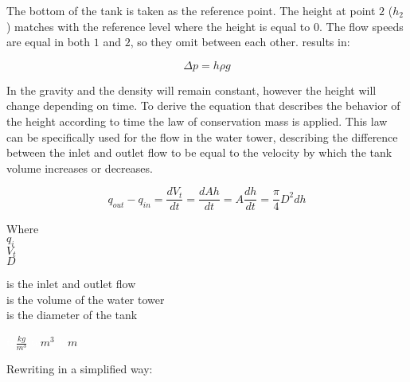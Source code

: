 The bottom of the tank is taken as the reference point. The height at point $2$ ($h_2$) matches with the reference level 
where the height is equal to 0. The flow speeds are equal in both $1$ 
and $2$, so they omit between each other.  results in: 

\begin{equation}
  \Delta p = h \rho g
  \label{Pressuredifference}
\end{equation}

In  the gravity and the density will remain constant, 
however the height will change depending on time. 
To derive the equation that describes the behavior of the height according to 
time the law of conservation mass is applied. This law can be specifically used for the flow in the water tower, describing the difference between the inlet and outlet flow 
to be equal to the velocity by which the tank volume increases or decreases. 

\begin{equation}
  q_{out} - q_{in} = \frac{dV_t}{dt} = \frac{dAh}{dt} = A \frac{dh}{dt} = \frac{\pi}{4} D^2 {dh}
  \label{FlowConservation}
\end{equation}

\begin{minipage}[t]{0.20\textwidth}
Where\\
\hspace*{8mm} $q_i$ \\
\hspace*{8mm} $V_t$ \\
\hspace*{8mm} $D$ 
\end{minipage}
\begin{minipage}[t]{0.68\textwidth}
\vspace*{2mm}
is the inlet and outlet flow\\
is the volume of the water tower\\
is the diameter of the tank 
\end{minipage}
\begin{minipage}[t]{0.10\textwidth}
\vspace*{2mm}
\textcolor{White}{te}$\unit{\frac{kg}{m^3}}$
\textcolor{White}{te}$\unit{m^3}$
\textcolor{White}{te}$\unit{m}$
\end{minipage}

Rewriting  in a simplified way:

